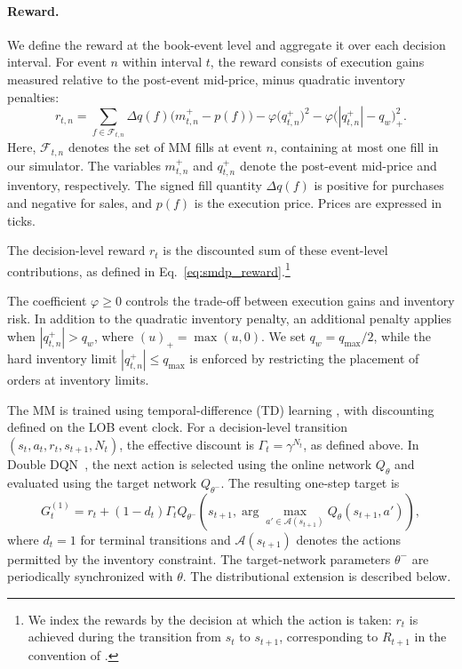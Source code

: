 \documentclass[11pt,a4paper]{article}
\begin{document}
\paragraph{Reward.}
We define the reward at the book-event level and aggregate
it over each decision interval. For event $n$ within
interval $t$, the reward consists of execution gains
measured relative to the post-event mid-price, minus
quadratic inventory penalties:
\begin{equation}
  \label{eq:reward}
  r_{t,n}
  =
  \sum_{f\in\mathcal{F}_{t,n}}
  \Delta q(f)\bigl(m^{+}_{t,n}-p(f)\bigr)
  -
  \varphi\bigl(q^{+}_{t,n}\bigr)^2
  -
  \varphi\bigl(|q^{+}_{t,n}|-q_w\bigr)_+^2.
\end{equation}
Here, $\mathcal{F}_{t,n}$ denotes the set of MM fills
at event $n$, containing at most one fill in our
simulator. The variables $m^+_{t,n}$ and $q^+_{t,n}$
denote the post-event mid-price and inventory,
respectively. The signed fill quantity $\Delta q(f)$
is positive for purchases and negative for sales,
and $p(f)$ is the execution price. Prices are expressed in ticks.

The decision-level reward $r_t$ is the discounted sum
of these event-level contributions, as defined in
Eq.~\eqref{eq:smdp_reward}.\footnote{We index the rewards by
the decision at which the action is taken: $r_t$ is achieved
during the transition from $s_t$ to $s_{t+1}$, corresponding
to $R_{t+1}$ in the convention of \citet{suttonbarto2018}.}

The coefficient $\varphi\geq0$ controls the trade-off between
execution gains and inventory risk. In addition to the quadratic
inventory penalty, an additional penalty applies when
$|q^+_{t,n}|>q_w$, where $(u)_+=\max(u,0)$.
We set $q_w=q_{\max}/2$, while the hard inventory limit
$|q^+_{t,n}|\leq q_{\max}$ is enforced by restricting
the placement of orders at inventory limits.

The MM is trained using temporal-difference (TD) learning
\citep{sutton1988td,watkins1992qlearning}, with discounting
defined on the LOB event clock. For a decision-level transition
$(s_t,a_t,r_t,s_{t+1},N_t)$, the effective discount is
$\Gamma_t=\gamma^{N_t}$, as defined above.
In Double DQN~\citep{vanhasselt2016}, the next action is
selected using the online network $Q_\theta$ and evaluated
using the target network $Q_{\theta^-}$. The resulting
one-step target is
\begin{equation}
  G_t^{(1)}
  =
  r_t+(1-d_t)\Gamma_t
  Q_{\theta^-}\!\left(
    s_{t+1},
    \arg\max_{a'\in\mathcal{A}(s_{t+1})}
    Q_\theta(s_{t+1},a')
  \right),
\end{equation}
where $d_t=1$ for terminal transitions and
$\mathcal{A}(s_{t+1})$ denotes the actions permitted by
the inventory constraint. The target-network parameters
$\theta^-$ are periodically synchronized with $\theta$.
The distributional extension is described below.
\end{document}
